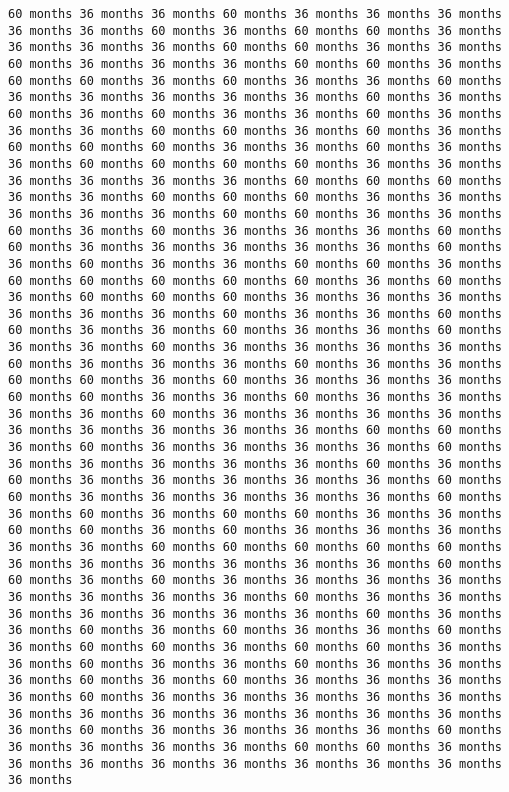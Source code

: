 \documentclass[11pt]{article}
\begin{document}
\begin{Verbatim}[commandchars=\\\{\}, frame=single, framerule=2mm, rulecolor=\color{outerrorbackground}]
60 months 36 months 36 months 60 months 36 months 36 months 36 months 36 months 36 months 60 months 36 months 60 months 60 months 36 months 36 months 36 months 36 months 60 months 60 months 36 months 36 months 60 months 36 months 36 months 36 months 60 months 60 months 36 months 60 months 60 months 36 months 60 months 36 months 36 months 60 months 36 months 36 months 36 months 36 months 36 months 60 months 36 months 60 months 36 months 60 months 36 months 36 months 60 months 36 months 36 months 36 months 60 months 60 months 36 months 60 months 36 months 60 months 60 months 60 months 36 months 36 months 60 months 36 months 36 months 60 months 60 months 60 months 60 months 36 months 36 months 36 months 36 months 36 months 36 months 60 months 60 months 60 months 36 months 36 months 60 months 60 months 60 months 36 months 36 months 36 months 36 months 36 months 60 months 60 months 36 months 36 months 60 months 36 months 60 months 36 months 36 months 36 months 60 months 60 months 36 months 36 months 36 months 36 months 36 months 60 months 36 months 60 months 36 months 36 months 60 months 60 months 36 months 60 months 60 months 60 months 60 months 60 months 36 months 60 months 36 months 60 months 60 months 60 months 36 months 36 months 36 months 36 months 36 months 36 months 60 months 36 months 36 months 60 months 60 months 36 months 36 months 60 months 36 months 36 months 60 months 36 months 36 months 60 months 36 months 36 months 36 months 36 months 60 months 36 months 36 months 36 months 60 months 36 months 36 months 60 months 60 months 36 months 60 months 36 months 36 months 36 months 60 months 60 months 36 months 36 months 60 months 36 months 36 months 36 months 36 months 60 months 36 months 36 months 36 months 36 months 36 months 36 months 36 months 36 months 36 months 60 months 60 months 36 months 60 months 36 months 36 months 36 months 36 months 60 months 36 months 36 months 36 months 36 months 36 months 60 months 36 months 60 months 36 months 36 months 36 months 36 months 36 months 60 months 60 months 36 months 36 months 36 months 36 months 36 months 60 months 36 months 60 months 36 months 60 months 60 months 36 months 36 months 60 months 60 months 36 months 60 months 36 months 36 months 36 months 36 months 36 months 60 months 60 months 60 months 60 months 60 months 36 months 36 months 36 months 36 months 36 months 36 months 60 months 60 months 36 months 60 months 36 months 36 months 36 months 36 months 36 months 36 months 36 months 36 months 60 months 36 months 36 months 36 months 36 months 36 months 36 months 36 months 60 months 36 months 36 months 60 months 36 months 60 months 36 months 36 months 60 months 36 months 60 months 60 months 36 months 60 months 60 months 36 months 36 months 60 months 36 months 36 months 60 months 36 months 36 months 36 months 60 months 36 months 60 months 36 months 36 months 36 months 36 months 60 months 36 months 36 months 36 months 36 months 36 months 36 months 36 months 36 months 36 months 36 months 36 months 36 months 36 months 60 months 36 months 36 months 36 months 36 months 60 months 36 months 36 months 36 months 36 months 60 months 60 months 36 months 36 months 36 months 36 months 36 months 36 months 36 months 36 months 36 months 
\end{Verbatim}
\end{document}
